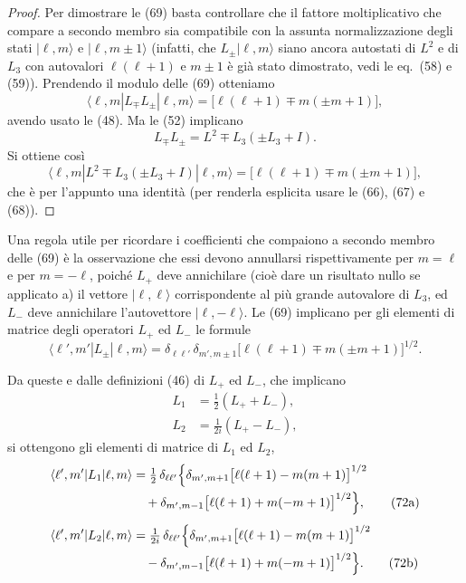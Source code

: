 \documentclass[11pt, a4paper]{book}
\numberwithin{equation}{section}
\begin{document}
\begin{proof}
Per dimostrare le (69) basta controllare che il fattore moltiplicativo che
compare a secondo membro sia compatibile con la assunta normalizzazione
degli stati $|\ell,m\rangle$ e $|\ell,m\pm1\rangle$ (infatti, che
$L_\pm|\ell,m\rangle$ siano ancora autostati di $L^2$ e di $L_3$ con
autovalori $\ell(\ell+1)$ e $m\pm1$ è già stato dimostrato, vedi le
eq.\ (58) e (59)). Prendendo il modulo delle (69) otteniamo
\[
\langle\ell,m|L_\mp L_\pm|\ell,m\rangle
= \bigl[\ell(\ell+1) \mp m(\pm m+1)\bigr],
\]
avendo usato le (48). Ma le (52) implicano
\[
L_\mp L_\pm = L^2 \mp L_3(\pm L_3+I).
\]
Si ottiene così
\[
\langle\ell,m|L^2 \mp L_3(\pm L_3+I)|\ell,m\rangle
= \bigl[\ell(\ell+1) \mp m(\pm m+1)\bigr],
\]
che è per l'appunto una identità (per renderla esplicita usare le (66),
(67) e (68)).
\end{proof}


Una regola utile per ricordare i coefficienti che compaiono a secondo
membro delle (69) è la osservazione che essi devono annullarsi
rispettivamente per $m = \ell$ e per $m = -\ell$, poiché $L_+$ deve
annichilare (cioè dare un risultato nullo se applicato a) il vettore
$|\ell,\ell\rangle$ corrispondente al più grande autovalore di $L_3$, ed
$L_-$ deve annichilare l'autovettore $|\ell,-\ell\rangle$. Le (69)
implicano per gli elementi di matrice degli operatori $L_+$ ed $L_-$ le
formule
\begin{equation}
\langle\ell',m'|L_\pm|\ell,m\rangle
= \delta_{\ell\ell'}\,\delta_{m',m\pm1}
  \bigl[\ell(\ell+1) \mp m(\pm m+1)\bigr]^{1/2}.
\end{equation}

Da queste e dalle definizioni (46) di $L_+$ ed $L_-$, che implicano
\begin{align}
L_1 &= \tfrac{1}{2}(L_+ + L_-), \tag{71a} \\
L_2 &= \tfrac{1}{2i}(L_+ - L_-), \tag{71b}
\end{align}
si ottengono gli elementi di matrice di $L_1$ ed $L_2$,
\begin{align}
\langle\ell',m'|L_1|\ell,m\rangle
&= \tfrac{1}{2}\,\delta_{\ell\ell'}\Bigl\{
   \delta_{m',m+1}\bigl[\ell(\ell+1)-m(m+1)\bigr]^{1/2}
   \notag \\ &\quad
  +\delta_{m',m-1}\bigl[\ell(\ell+1)+m(-m+1)\bigr]^{1/2}
   \Bigr\}, \tag{72a} \\[4pt]
\langle\ell',m'|L_2|\ell,m\rangle
&= \tfrac{1}{2i}\,\delta_{\ell\ell'}\Bigl\{
   \delta_{m',m+1}\bigl[\ell(\ell+1)-m(m+1)\bigr]^{1/2}
   \notag \\ &\quad
  -\delta_{m',m-1}\bigl[\ell(\ell+1)+m(-m+1)\bigr]^{1/2}
   \Bigr\}. \tag{72b}
\end{align}
\end{document}
